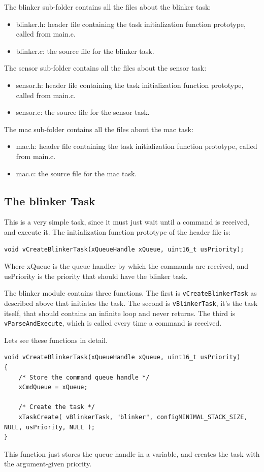 \documentclass[11pt]{report}
\begin{document}
The blinker sub-folder contains all the files about the blinker task:
\begin{itemize}
	\item blinker.h: header file containing the task initialization function prototype, called from main.c.
	\item blinker.c: the source file for the blinker task.
\end{itemize}

The sensor sub-folder contains all the files about the sensor task:
\begin{itemize}
	\item sensor.h: header file containing the task initialization function prototype, called from main.c.
	\item sensor.c: the source file for the sensor task.
\end{itemize}


The mac sub-folder contains all the files about the mac task:
\begin{itemize}
	\item mac.h: header file containing the task initialization function prototype, called from main.c.
	\item mac.c: the source file for the mac task.
\end{itemize}

\subsection{The blinker Task}
This is a very simple task, since it must just wait until a command is received, and execute it. The initialization function prototype of the header file is:
\begin{verbatim}
void vCreateBlinkerTask(xQueueHandle xQueue, uint16_t usPriority);
\end{verbatim}
Where xQueue is the queue handler by which the commands are received, and usPriority is the priority that should have the blinker task.

The blinker module contains three functions. The first is \verb$vCreateBlinkerTask$ as described above that initiates the task. The second is \verb$vBlinkerTask$, it's the task itself, that should contains an infinite loop and never returns. The third is \verb$vParseAndExecute$, which is called every time a command is received.

Lets see these functions in detail.

\begin{verbatim}
void vCreateBlinkerTask(xQueueHandle xQueue, uint16_t usPriority)
{
    /* Store the command queue handle */
    xCmdQueue = xQueue;
    
    /* Create the task */
    xTaskCreate( vBlinkerTask, "blinker", configMINIMAL_STACK_SIZE, NULL, usPriority, NULL );
}
\end{verbatim}
This function just stores the queue handle in a variable, and creates the task with the argument-given priority.
\end{document}
